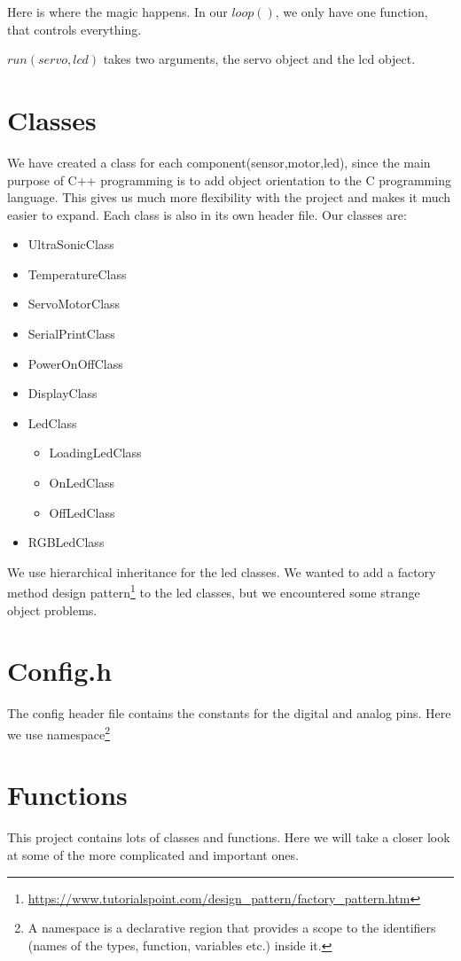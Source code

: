 Here is where the magic happens. In our $loop()$, we only have one function, that controls everything.

$run(servo, lcd)$ takes two arguments, the servo object and the lcd object. 

\section{Classes}
We have created a class for each component(sensor,motor,led), since the main purpose of C++ programming is to add object orientation to the C programming language. This gives us much more flexibility with the project and makes it much easier to expand. Each class is also in its own header file. Our classes are:
\begin{itemize}
  \item UltraSonicClass
  \item TemperatureClass
  \item ServoMotorClass
  \item SerialPrintClass
  \item PowerOnOffClass
  \item DisplayClass
  \item LedClass
  \begin{itemize}
     \item LoadingLedClass
     \item OnLedClass
     \item OffLedClass
   \end{itemize}
  \item RGBLedClass
\end{itemize}

We use hierarchical inheritance for the led classes. We wanted to add a factory method design pattern\footnote{\url{https://www.tutorialspoint.com/design_pattern/factory_pattern.htm}} to the led classes, but we encountered some strange object problems.  

\section{Config.h}
The config header file contains the constants for the digital and analog pins. Here we use namespace\footnote{A namespace is a declarative region that provides a scope to the identifiers (names of the types, function, variables etc.) inside it.}

\section{Functions}
This project contains lots of classes and functions. Here we will take a closer look at some of the more complicated and important ones.

